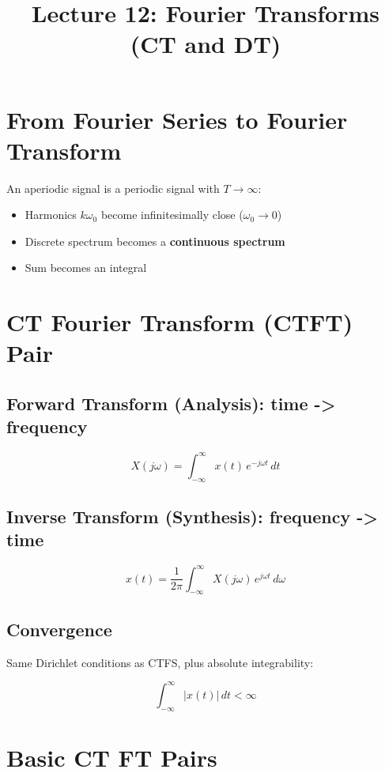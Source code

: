 \documentclass[11pt]{article}
\title{Lecture 12: Fourier Transforms (CT and DT)}
\author{}
\date{}
\begin{document}
\maketitle

\section*{From Fourier Series to Fourier Transform}

An aperiodic signal is a periodic signal with $T \to \infty$:
\begin{itemize}
  \item Harmonics $k\omega_0$ become infinitesimally close ($\omega_0 \to 0$)
  \item Discrete spectrum becomes a \textbf{continuous spectrum}
  \item Sum becomes an integral
\end{itemize}

\section*{CT Fourier Transform (CTFT) Pair}

\subsection*{Forward Transform (Analysis): time -> frequency}

\[X(j\omega) = \int_{-\infty}^{\infty} x(t) \, e^{-j\omega t} \, dt\]

\subsection*{Inverse Transform (Synthesis): frequency -> time}

\[x(t) = \frac{1}{2\pi} \int_{-\infty}^{\infty} X(j\omega) \, e^{j\omega t} \, d\omega\]

\subsection*{Convergence}

Same Dirichlet conditions as CTFS, plus absolute integrability:

\[\int_{-\infty}^{\infty} |x(t)| \, dt < \infty\]

\section*{Basic CT FT Pairs}
\end{document}
